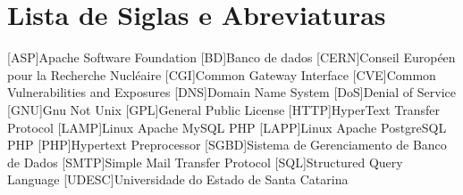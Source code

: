 \chapter*{Lista de Siglas e Abreviaturas}
\begin{acronym}

[ASP]{Apache Software Foundation}
[BD]{Banco de dados}
[CERN]{Conseil Européen pour la Recherche Nucléaire}
[CGI]{Common Gateway Interface}
[CVE]{Common Vulnerabilities and Exposures}
[DNS]{Domain Name System}
[DoS]{Denial of Service}
[GNU]{Gnu Not Unix}
[GPL]{General Public License}
[HTTP]{HyperText Transfer Protocol}
[LAMP]{Linux Apache MySQL PHP}
[LAPP]{Linux Apache PostgreSQL PHP}
[PHP]{Hypertext Preprocessor}
[SGBD]{Sistema de Gerenciamento de Banco de Dados}
[SMTP]{Simple Mail Transfer Protocol}
[SQL]{Structured Query Language}
[UDESC]{Universidade do Estado de Santa Catarina}
\begin{comment}
\acro{CLI}[CLI]{Command Line Interface}
\acro{CPU}[CPU]{Central Processing Unit}
\acro{DPCF}[DPCF]{Data Plane Control Function}
\acro{IETF}[IETF]{Internet Engineering Task Force}
\acro{IO}[I/O]{Input/Output}
\acro{LSD}[LSD]{Link State Database}
\acro{NFS}[NFS]{Network File System}
\acro{ONF}[ONF]{Open Networking Fundation}
\acro{OSPF}[OSPF]{Open Shortest Path First}
\acro{PRNG}[PRNG]{Pseudo-Random Number Generator}
\acro{QOS}[QOS]{Quality of Service}
\acro{RAM}[RAM]{Random Access Memory}
\acro{SDN}[SDN]{Software Defined Network}
\acro{SNMP}[SNMP]{Simple Network Management Protocol}
\end{comment}

\end{acronym}
